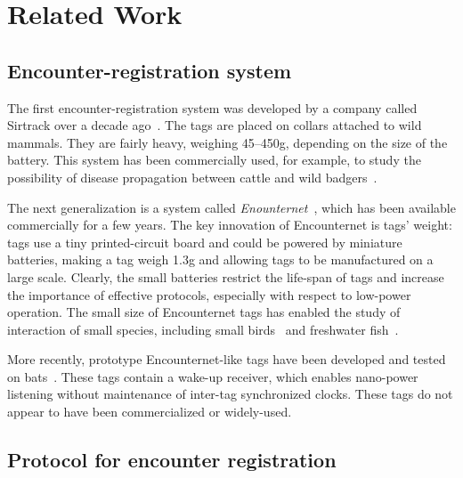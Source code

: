 \section{Related Work}
\label{sec:related-work}

\subsection{Encounter-registration system}
The first encounter-registration system was developed by a company called Sirtrack 
over a decade ago~\cite{Prangle2006NewRadiocolars}. The tags
are placed on collars attached to wild mammals. 
They are fairly heavy, weighing 45--450g, depending on the
size of the battery. %
This system has been commercially used, for example, to study 
the possibility of disease propagation between cattle 
and wild badgers~\cite{Bohm2009WildlifeLivestock}.

The next generalization is a system called 
{\em Enounternet}~\cite{Menhill2012NovelTelemetry,Rutz2012AutomatedMapping}, 
which has been available commercially for a few years. 
The key innovation of Encounternet is tags' weight: 
tags use a tiny printed-circuit board and
could be powered by miniature batteries, making a tag 
weigh 1.3g and allowing tags to be manufactured on a large scale. 
Clearly, the small batteries restrict the life-span of 
tags and increase the importance of effective protocols, 
especially with respect to low-power operation. 
The small size of Encounternet tags has enabled the 
study of interaction of small species, 
including small birds~\cite{Levin2015Performance} 
and freshwater fish~\cite{Tentelier2016FishNetwork}.

More recently, prototype Encounternet-like tags have been 
developed and tested on bats~\cite{Ripperger2016ProximitySensing,dressler2016bats}. 
These tags contain a wake-up receiver, which
enables nano-power listening without maintenance 
of inter-tag synchronized clocks. These tags  
do not appear to have been commercialized or widely-used.

\subsection{Protocol for encounter registration}


